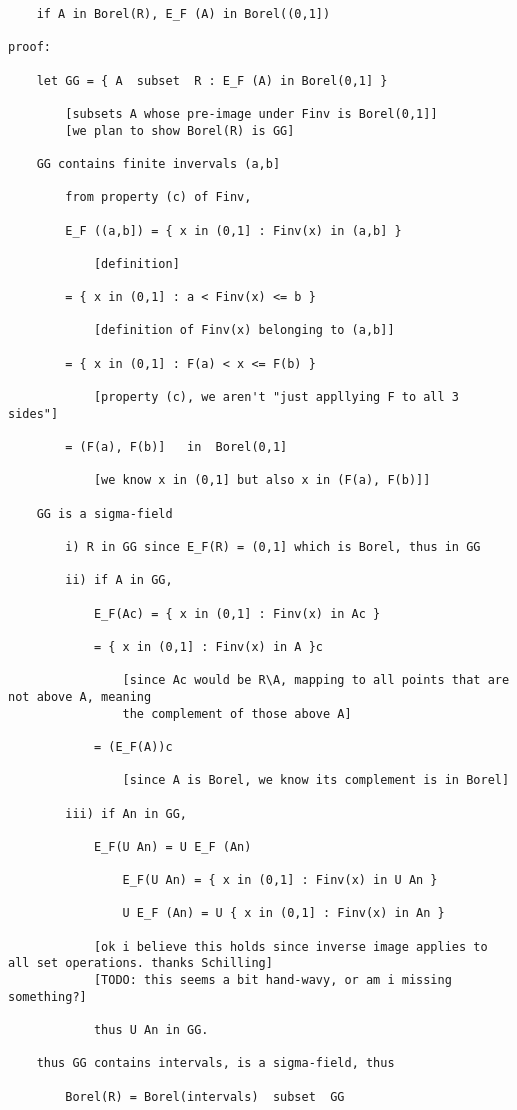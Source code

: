 \documentclass{article}
\begin{document}
\begin{flushleft}
\begin{verbatim}
	if A in Borel(R), E_F (A) in Borel((0,1])
	
proof:

	let GG = { A  subset  R : E_F (A) in Borel(0,1] }
	
		[subsets A whose pre-image under Finv is Borel(0,1]]
		[we plan to show Borel(R) is GG]
	
	GG contains finite invervals (a,b]
	
		from property (c) of Finv, 
		
		E_F ((a,b]) = { x in (0,1] : Finv(x) in (a,b] }
		
			[definition]
			
		= { x in (0,1] : a < Finv(x) <= b }
	
			[definition of Finv(x) belonging to (a,b]]
			
		= { x in (0,1] : F(a) < x <= F(b) }
	
			[property (c), we aren't "just appllying F to all 3 sides"]
	
		= (F(a), F(b)]   in  Borel(0,1]
		
			[we know x in (0,1] but also x in (F(a), F(b)]]
			
	GG is a sigma-field
	
		i) R in GG since E_F(R) = (0,1] which is Borel, thus in GG
		
		ii) if A in GG, 
		
			E_F(Ac) = { x in (0,1] : Finv(x) in Ac }
			
			= { x in (0,1] : Finv(x) in A }c 
			
				[since Ac would be R\A, mapping to all points that are not above A, meaning 
				the complement of those above A]
				
			= (E_F(A))c
			
				[since A is Borel, we know its complement is in Borel]
				
		iii) if An in GG,
		
			E_F(U An) = U E_F (An) 
		
				E_F(U An) = { x in (0,1] : Finv(x) in U An }
			
				U E_F (An) = U { x in (0,1] : Finv(x) in An }
			
			[ok i believe this holds since inverse image applies to all set operations. thanks Schilling]
			[TODO: this seems a bit hand-wavy, or am i missing something?]
			
			thus U An in GG.
	
	thus GG contains intervals, is a sigma-field, thus
	
		Borel(R) = Borel(intervals)  subset  GG
		

\end{verbatim}
\end{flushleft}
\end{document}
